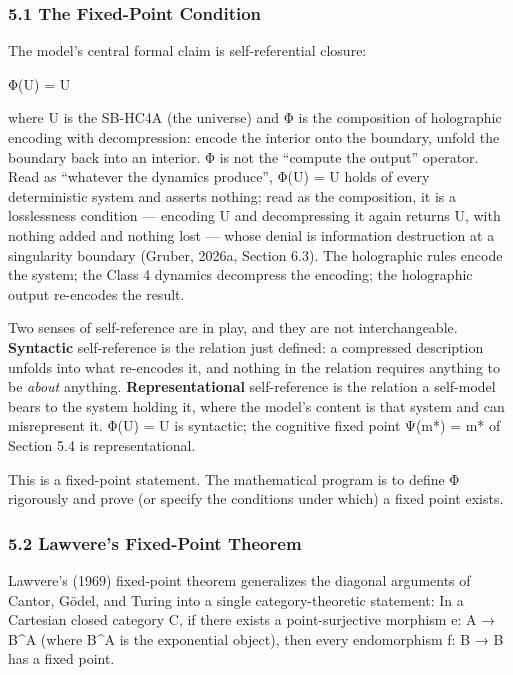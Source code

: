 \documentclass[
]{article}
\begin{document}
\hypertarget{the-fixed-point-condition}{%
\subsubsection{5.1 The Fixed-Point
Condition}\label{the-fixed-point-condition}}

The model's central formal claim is self-referential closure:

Φ(U) = U

where U is the SB-HC4A (the universe) and Φ is the composition of
holographic encoding with decompression: encode the interior onto the
boundary, unfold the boundary back into an interior. Φ is not the
``compute the output'' operator. Read as ``whatever the dynamics
produce'', Φ(U) = U holds of every deterministic system and asserts
nothing; read as the composition, it is a losslessness condition ---
encoding U and decompressing it again returns U, with nothing added and
nothing lost --- whose denial is information destruction at a
singularity boundary (Gruber, 2026a, Section 6.3). The holographic rules
encode the system; the Class 4 dynamics decompress the encoding; the
holographic output re-encodes the result.

Two senses of self-reference are in play, and they are not
interchangeable. \textbf{Syntactic} self-reference is the relation just
defined: a compressed description unfolds into what re-encodes it, and
nothing in the relation requires anything to be \emph{about} anything.
\textbf{Representational} self-reference is the relation a self-model
bears to the system holding it, where the model's content is that system
and can misrepresent it. Φ(U) = U is syntactic; the cognitive fixed
point Ψ(m*) = m* of Section 5.4 is representational.

This is a fixed-point statement. The mathematical program is to define Φ
rigorously and prove (or specify the conditions under which) a fixed
point exists.

\hypertarget{lawveres-fixed-point-theorem}{%
\subsubsection{5.2 Lawvere's Fixed-Point
Theorem}\label{lawveres-fixed-point-theorem}}

Lawvere's (1969) fixed-point theorem generalizes the diagonal arguments
of Cantor, Gödel, and Turing into a single category-theoretic statement:
In a Cartesian closed category C, if there exists a point-surjective
morphism e: A → B\^{}A (where B\^{}A is the exponential object), then
every endomorphism f: B → B has a fixed point.
\end{document}
